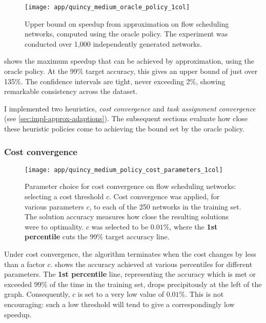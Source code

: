 \begin{figure}
    \centering
    \texttt{[image: app/quincy\_medium\_oracle\_policy\_1col]}
    \caption[Upper bound on speedup from approximation with flow scheduling]{Upper bound on speedup from approximation on flow scheduling networks, computed using the oracle policy. The experiment was conducted over 1,000 independently generated networks.}
    \label{fig:app-quincy-medium-oracle}
\end{figure}

 shows the maximum speedup that can be achieved by approximation, using the oracle policy. At the 99\% target accuracy, this gives an upper bound of just over 135\%. The confidence intervals are tight, never exceeding 2\%, showing remarkable consistency across the dataset.

I implemented two heuristics, \emph{cost convergence} and \emph{task assignment convergence} (see \cref{sec:impl-approx-adaptions}). The subsequent sections evaluate how close these heuristic policies come to achieving the bound set by the oracle policy.

\subsubsection{Cost convergence}

\begin{figure}
    \centering
    \texttt{[image: app/quincy\_medium\_policy\_cost\_parameters\_1col]}
    \caption[Parameter choice for cost convergence with flow scheduling]{Parameter choice for cost convergence on flow scheduling networks: selecting a cost threshold $c$. Cost convergence was applied, for various parameters $c$, to each of the 250 networks in the training set. The solution accuracy measures how close the resulting solutions were to optimality. $c$ was selected to be $0.01\%$, where the \textbf{\color{matplotlib_blue} 1st percentile} cuts the 99\% target accuracy line.}
    \label{fig:app-quincy-medium-cost-parameters}
\end{figure}

Under cost convergence, the algorithm terminates when the cost changes by less than a factor $c$.  shows the accuracy achieved at various percentiles for different parameters. The \textbf{\color{matplotlib_blue} 1st percentile} line, representing the accuracy which is met or exceeded 99\% of the time in the training set, drops precipitously at the left of the graph. Consequently, $c$ is set to a very low value of $0.01\%$. This is not encouraging: such a low threshold will tend to give a correspondingly low speedup.

